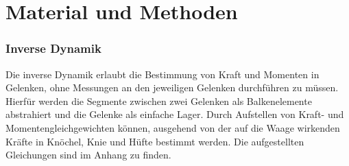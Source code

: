 \section{Material und Methoden}

\subsubsection{Inverse Dynamik}
Die inverse Dynamik erlaubt die Bestimmung von Kraft und Momenten in Gelenken, ohne Messungen an den jeweiligen Gelenken durchführen zu müssen. Hierfür werden die Segmente zwischen zwei Gelenken als Balkenelemente abstrahiert und die Gelenke als einfache Lager. Durch Aufstellen von Kraft- und Momentengleichgewichten können, ausgehend von der auf die Waage wirkenden Kräfte in Knöchel, Knie und Hüfte bestimmt werden. Die aufgestellten Gleichungen sind im Anhang zu finden.



